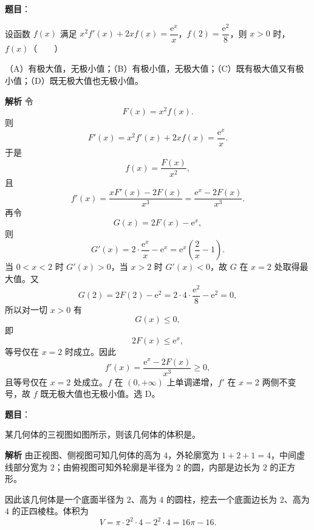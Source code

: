 \begin{answer}

\textbf{题目}：

设函数 $f(x)$ 满足 $x^2f'(x)+2xf(x)=\dfrac{\mathrm e^x}{x}$，$f(2)=\dfrac{\mathrm e^2}8$，则 $x>0$ 时，$f(x)$\mbox{（　　）}

（A）有极大值，无极小值；（B）有极小值，无极大值；（C）既有极大值又有极小值；（D）既无极大值也无极小值。

\textbf{解析}
令
\nopagebreak[4]
\[F(x)=x^2f(x).\]
则
\nopagebreak[4]
\[F'(x)=x^2f'(x)+2xf(x)=\frac{\mathrm e^x}{x}.\]
于是
\nopagebreak[4]
\[f(x)=\frac{F(x)}{x^2},\]
且
\nopagebreak[4]
\[f'(x)=\frac{xF'(x)-2F(x)}{x^3}
=\frac{\mathrm e^x-2F(x)}{x^3}.\]
再令
\nopagebreak[4]
\[G(x)=2F(x)-\mathrm e^x,\]
则
\nopagebreak[4]
\[G'(x)=2\cdot\frac{\mathrm e^x}{x}-\mathrm e^x=\mathrm e^x\left(\frac2x-1\right).\]
当 $0<x<2$ 时 $G'(x)>0$，当 $x>2$ 时 $G'(x)<0$，故 $G$ 在 $x=2$ 处取得最大值。又
\nopagebreak[4]
\[G(2)=2F(2)-\mathrm e^2=2\cdot4\cdot\frac{\mathrm e^2}8-\mathrm e^2=0,\]
所以对一切 $x>0$ 有
\nopagebreak[4]
\[G(x)\leqslant0,\]
即
\nopagebreak[4]
\[2F(x)\leqslant\mathrm e^x,\]
等号仅在 $x=2$ 时成立。因此
\nopagebreak[4]
\[f'(x)=\frac{\mathrm e^x-2F(x)}{x^3}\geqslant0,\]
且等号仅在 $x=2$ 处成立。$f$ 在 $(0,+\infty)$ 上单调递增，$f'$ 在 $x=2$ 两侧不变号，故 $f$ 既无极大值也无极小值。选 D。


\end{answer}
\begin{answer}

\textbf{题目}：

某几何体的三视图如图所示，则该几何体的体积是\gkblank{}。
\nopagebreak[4]
\begin{center}\end{center}
\nopagebreak[4]
\textbf{解析}
由正视图、侧视图可知几何体的高为 $4$，外轮廓宽为 $1+2+1=4$，中间虚线部分宽为 $2$；由俯视图可知外轮廓是半径为 $2$ 的圆，内部是边长为 $2$ 的正方形。

因此该几何体是一个底面半径为 $2$、高为 $4$ 的圆柱，挖去一个底面边长为 $2$、高为 $4$ 的正四棱柱。体积为
\nopagebreak[4]
\[V=\pi\cdot2^2\cdot4-2^2\cdot4=16\pi-16.\]


\end{answer}
